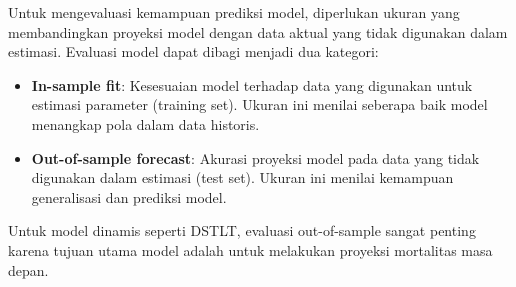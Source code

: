 Untuk mengevaluasi kemampuan prediksi model, diperlukan ukuran yang membandingkan proyeksi model dengan data aktual yang tidak digunakan dalam estimasi. Evaluasi model dapat dibagi menjadi dua kategori:

\begin{itemize}
    \item \textbf{In-sample fit}: Kesesuaian model terhadap data yang digunakan untuk estimasi parameter (training set). Ukuran ini menilai seberapa baik model menangkap pola dalam data historis.
    
    \item \textbf{Out-of-sample forecast}: Akurasi proyeksi model pada data yang tidak digunakan dalam estimasi (test set). Ukuran ini menilai kemampuan generalisasi dan prediksi model.
\end{itemize}

Untuk model dinamis seperti DSTLT, evaluasi out-of-sample sangat penting karena tujuan utama model adalah untuk melakukan proyeksi mortalitas masa depan.


